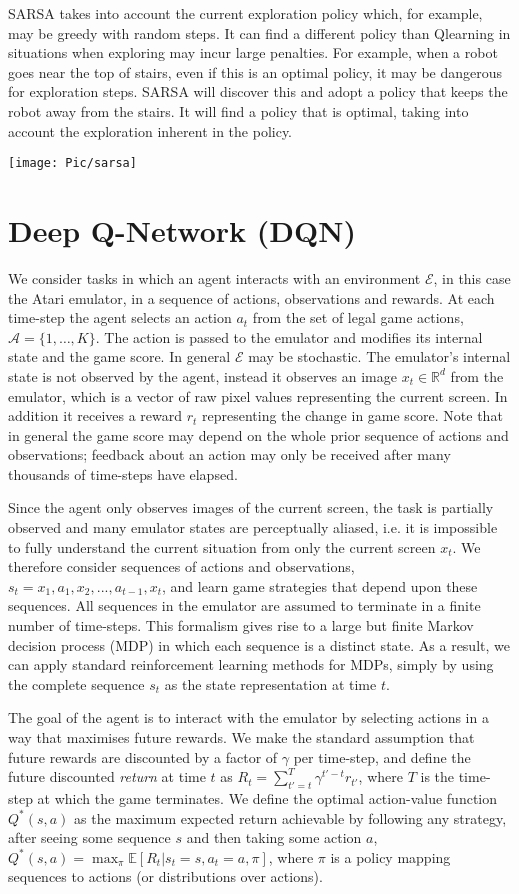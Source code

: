 \documentclass[a4paper, 11pt]{article}
\begin{document}
SARSA takes into account the current exploration policy which, for example, may be greedy with random steps. It can find a different policy than Qlearning in situations when exploring may incur large penalties. For example,
when a robot goes near the top of stairs, even if this is an optimal policy, it may be dangerous for exploration steps. SARSA will discover this and adopt a policy that keeps the robot away from the stairs. It will find a policy that is optimal, taking into account the exploration inherent in the policy.

\texttt{[image: Pic/sarsa]}
\section{Deep Q-Network (DQN) }
We consider tasks in which an agent interacts with an environment $\mathcal{E}$, in this case the Atari emulator, in a sequence of actions, observations and rewards. 
At each time-step the agent selects an action $a_t$ from the set of legal game actions, $\mathcal{A}=\{1, \ldots, K \}$. The action is passed to the emulator and modifies its internal state and the game score. In general $\mathcal{E}$ may be stochastic. The emulator's internal state is not observed by the agent,  instead it observes an image $x_t\in\mathbb{R}^d$ from the emulator, which is a vector of raw pixel values representing the current screen. In addition it receives a reward $r_t$ representing the change in game score. Note that in general the game score may depend on the whole prior sequence of actions and observations; feedback about an action may only be received after many thousands of time-steps have elapsed. 

Since the agent only observes images of the current screen, the task is partially observed and many emulator states are perceptually aliased, i.e. it is impossible to fully understand the current situation from only the current screen $x_t$. We therefore consider sequences of actions and observations, $s_t = {x_1, a_1, x_2, ..., a_{t-1}, x_t}$, and learn game strategies that depend upon these sequences. All sequences in the emulator are assumed to terminate in a finite number of time-steps. This formalism gives rise to a large but finite Markov decision process (MDP) in which each sequence is a distinct state. As a result, we can apply standard reinforcement learning methods for MDPs, simply by using the complete sequence $s_t$ as the state representation at time $t$.

The goal of the agent is to interact with the emulator by selecting actions in a way that maximises future rewards. We make the standard assumption that future rewards are discounted by a factor of $\gamma$ per time-step, and define the future discounted \emph{return} at time $t$ as $R_t = \sum_{t'=t}^{T} \gamma^{t'-t} r_{t'}$, where $T$
is the time-step at which the game terminates. We define the optimal action-value function $Q^*(s,a)$ as the maximum expected return achievable by following any strategy, after seeing some sequence $s$ and then taking some action $a$, $Q^*(s,a) = \max_{\pi} \mathbb E[R_t | s_t=s, a_t=a, \pi ]$, where $\pi$ is a policy mapping sequences to actions (or distributions over actions).
\end{document}
